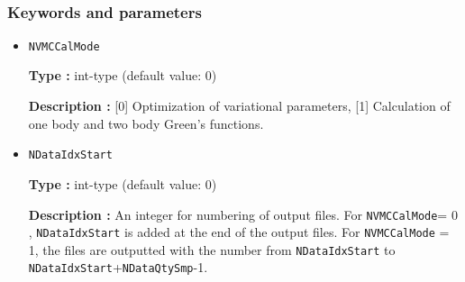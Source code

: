 ~\subsubsection{Keywords and parameters}
 \begin{itemize}





 
 
 \item  \verb|NVMCCalMode|

 {\bf Type :} int-type (default value: 0)

{\bf Description :} [0] Optimization of variational parameters, [1] Calculation of one body and two body Green's functions.



 
 \item  \verb|NDataIdxStart|

 {\bf Type :} int-type (default value: 0)

{\bf Description :} An integer for numbering of output files. For \verb|NVMCCalMode|= 0 , \verb|NDataIdxStart| is added at the end of the output files. For \verb|NVMCCalMode| = 1,  the files are outputted with the number from \verb|NDataIdxStart| to  \verb|NDataIdxStart|+\verb|NDataQtySmp|-1.
   

\end{itemize}
